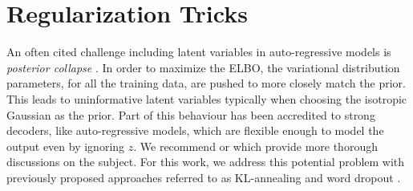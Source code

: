 








\section{Regularization Tricks}


An often cited challenge including latent variables in auto-regressive models is  \textit{posterior collapse} \cite{he2018lagging}. In order to maximize the \ac{ELBO}, the variational distribution parameters, for all the training data, are pushed to more closely match the prior. This leads to uninformative latent variables typically when choosing the isotropic Gaussian as the prior. Part of this behaviour has been accredited to strong decoders, like auto-regressive models, which are flexible enough to model the output even by ignoring $z$. We recommend \citet{chen2016VariationalLossyAE} or \citet{zhao2017InfoVAE} which provide more thorough discussions on the subject. For this work, we address this potential problem with previously proposed approaches referred to as KL-annealing \cite{bowman2015GeneratingSent,sonderby2016LadderVAE} and word dropout \cite{bowman2015GeneratingSent}.

